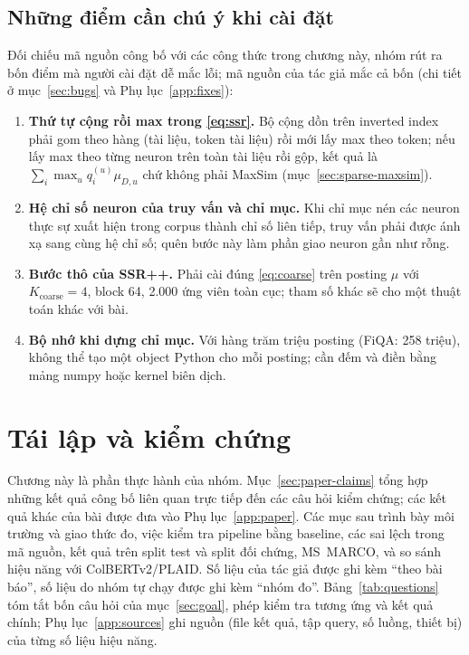 \documentclass[a4paper,13pt]{extreport}
\theoremstyle{plain}
\newcommand{\ssrpp}{SSR++}
\begin{document}
\section{Những điểm cần chú ý khi cài đặt}
\label{sec:impl-notes}
Đối chiếu mã nguồn công bố với các công thức trong chương này, nhóm rút ra bốn điểm mà người cài đặt dễ mắc lỗi; mã nguồn của tác giả mắc cả bốn (chi tiết ở mục~\ref{sec:bugs} và Phụ lục~\ref{app:fixes}):
\begin{enumerate}[leftmargin=1.5cm]
  \item \textbf{Thứ tự cộng rồi max trong \eqref{eq:ssr}.} Bộ cộng dồn trên inverted index phải gom theo hàng (tài liệu, token tài liệu) rồi mới lấy max theo token; nếu lấy max theo từng neuron trên toàn tài liệu rồi gộp, kết quả là $\sum_i\max_u q_i^{(u)}\mu_{D,u}$ chứ không phải MaxSim (mục~\ref{sec:sparse-maxsim}).
  \item \textbf{Hệ chỉ số neuron của truy vấn và chỉ mục.} Khi chỉ mục nén các neuron thực sự xuất hiện trong corpus thành chỉ số liên tiếp, truy vấn phải được ánh xạ sang cùng hệ chỉ số; quên bước này làm phần giao neuron gần như rỗng.
  \item \textbf{Bước thô của \ssrpp.} Phải cài đúng \eqref{eq:coarse} trên posting $\mu$ với $K_{\mathrm{coarse}}=4$, block 64, 2.000 ứng viên toàn cục; tham số khác sẽ cho một thuật toán khác với bài.
  \item \textbf{Bộ nhớ khi dựng chỉ mục.} Với hàng trăm triệu posting (FiQA: 258 triệu), không thể tạo một object Python cho mỗi posting; cần đếm và điền bằng mảng numpy hoặc kernel biên dịch.
\end{enumerate}
\chapter{Tái lập và kiểm chứng}
\label{ch:repro}

Chương này là phần thực hành của nhóm. Mục~\ref{sec:paper-claims} tổng hợp những kết quả công bố liên quan trực tiếp đến các câu hỏi kiểm chứng; các kết quả khác của bài được đưa vào Phụ lục~\ref{app:paper}. Các mục sau trình bày môi trường và giao thức đo, việc kiểm tra pipeline bằng baseline, các sai lệch trong mã nguồn, kết quả trên split test và split đối chứng, MS~MARCO, và so sánh hiệu năng với ColBERTv2/PLAID. Số liệu của tác giả được ghi kèm ``theo bài báo'', số liệu do nhóm tự chạy được ghi kèm ``nhóm đo''. Bảng~\ref{tab:questions} tóm tắt bốn câu hỏi của mục~\ref{sec:goal}, phép kiểm tra tương ứng và kết quả chính; Phụ lục~\ref{app:sources} ghi nguồn (file kết quả, tập query, số luồng, thiết bị) của từng số liệu hiệu năng.
\end{document}
